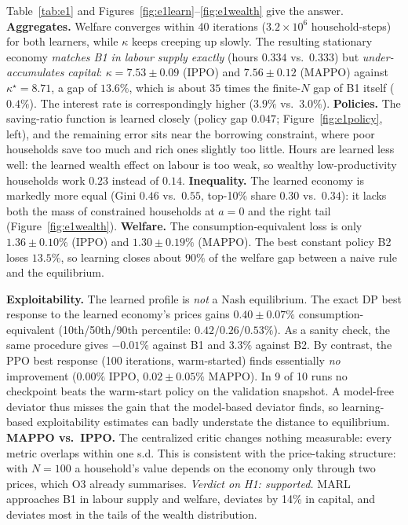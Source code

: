Table~\ref{tab:e1} and Figures~\ref{fig:e1learn}--\ref{fig:e1wealth} give the answer. \textbf{Aggregates.} Welfare
converges within 40 iterations ($3.2\times10^6$ household-steps) for both learners, while $\kappa$ keeps creeping up
slowly. The resulting stationary economy \emph{matches B1 in
labour supply exactly} (hours $0.334$ vs.\ $0.333$) but \emph{under-accumulates capital}: $\kappa=7.53\pm0.09$ (IPPO)
and $7.56\pm0.12$ (MAPPO) against $\kappa^\star=8.71$, a gap of $13.6\%$, which is about $35$ times the finite-$N$
gap of B1 itself ($0.4\%$). The interest rate is correspondingly higher ($3.9\%$ vs.\ $3.0\%$). \textbf{Policies.}
The saving-ratio function is learned closely (policy gap $0.047$; Figure~\ref{fig:e1policy}, left), and the remaining
error sits near the borrowing constraint, where poor households save too much and rich ones slightly too little. Hours
are learned less well: the learned wealth effect on labour is too weak, so wealthy low-productivity households
work $0.23$ instead of $0.14$. \textbf{Inequality.} The learned economy is markedly more equal (Gini $0.46$
vs.\ $0.55$, top-10\% share $0.30$ vs.\ $0.34$): it lacks both the mass of constrained households at $a=0$ and the
right tail (Figure~\ref{fig:e1wealth}). \textbf{Welfare.} The consumption-equivalent loss is only $1.36\pm0.10\%$
(IPPO) and $1.30\pm0.19\%$ (MAPPO). The best constant policy B2 loses $13.5\%$, so learning closes about $90\%$ of the
welfare gap between a naive rule and the equilibrium.

\textbf{Exploitability.} The learned profile is \emph{not} a Nash equilibrium. The exact DP best response to the
learned economy's prices gains $0.40\pm0.07\%$ consumption-equivalent (10th/50th/90th percentile: $0.42/0.26/0.53\%$).
As a sanity check, the same procedure gives $-0.01\%$ against B1 and $3.3\%$ against B2. By contrast, the PPO best
response (100 iterations, warm-started) finds essentially \emph{no} improvement ($0.00\%$ IPPO, $0.02\pm0.05\%$ MAPPO).
In 9 of 10 runs no checkpoint beats the warm-start policy on the validation snapshot. A model-free deviator thus misses
the gain that the model-based deviator finds, so learning-based exploitability estimates can badly understate the
distance to equilibrium.
\textbf{MAPPO vs.\ IPPO.} The centralized critic changes nothing measurable: every metric overlaps within one s.d.
This is consistent with the price-taking structure: with $N=100$ a household's value depends on the economy only
through two prices, which O3 already summarises.
\emph{Verdict on H1: supported.} MARL approaches B1 in labour supply and welfare, deviates by 14\% in capital,
and deviates most in the tails of the wealth distribution.


